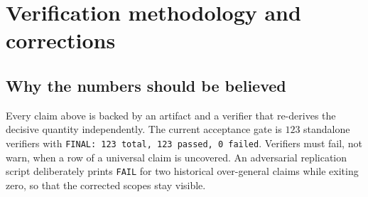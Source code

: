 \documentclass[11pt]{article}
\theoremstyle{definition}
\begin{document}
\section{Verification methodology and corrections}\label{sec:corrections}

\subsection{Why the numbers should be believed}
Every claim above is backed by an artifact and a verifier that re-derives the decisive quantity
independently. The current acceptance gate is $123$ standalone verifiers with
\texttt{FINAL: 123 total, 123 passed, 0 failed}. Verifiers must fail, not warn, when a row of a
universal claim is uncovered. An adversarial replication script deliberately prints \texttt{FAIL} for
two historical over-general claims while exiting zero, so that the corrected scopes stay visible.
\end{document}
